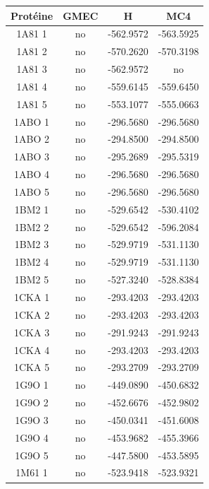 \documentclass[a4paper,12pt]{article}
\begin{document}
    \begin{table}[h]
      \centering

      \begin{tabular}{|c|c|c|c|}

        \hline
        \hline
        Protéine & GMEC & H & MC4 \\
        \hline
        1A81 1 & no & -562.9572 & -563.5925 \\
        1A81 2 & no & -570.2620 & -570.3198 \\
        1A81 3 & no & -562.9572 & no \\
        1A81 4 & no & -559.6145 & -559.6450 \\
        1A81 5 & no & -553.1077 & -555.0663 \\
        1ABO 1 & no & -296.5680 & -296.5680 \\
        1ABO 2 & no & -294.8500 & -294.8500 \\
        1ABO 3 & no & -295.2689 & -295.5319 \\
        1ABO 4 & no & -296.5680 & -296.5680 \\
        1ABO 5 & no & -296.5680 & -296.5680 \\
        1BM2 1 & no & -529.6542 & -530.4102 \\
        1BM2 2 & no & -529.6542 & -596.2084 \\
        1BM2 3 & no & -529.9719 & -531.1130 \\
        1BM2 4 & no & -529.9719 & -531.1130 \\
        1BM2 5 & no & -527.3240 & -528.8384 \\
        1CKA 1 & no & -293.4203 & -293.4203 \\
        1CKA 2 & no & -293.4203 & -293.4203 \\
        1CKA 3 & no & -291.9243 & -291.9243 \\
        1CKA 4 & no & -293.4203 & -293.4203 \\
        1CKA 5 & no & -293.2709 & -293.2709 \\
        1G9O 1 & no & -449.0890 & -450.6832 \\
        1G9O 2 & no & -452.6676 & -452.9802 \\
        1G9O 3 & no & -450.0341 & -451.6008 \\
        1G9O 4 & no & -453.9682 & -455.3966 \\
        1G9O 5 & no & -447.5800 & -453.5895 \\
        1M61 1 & no & -523.9418 & -523.9321 \\

\end{tabular}
\end{table}
\end{document}
